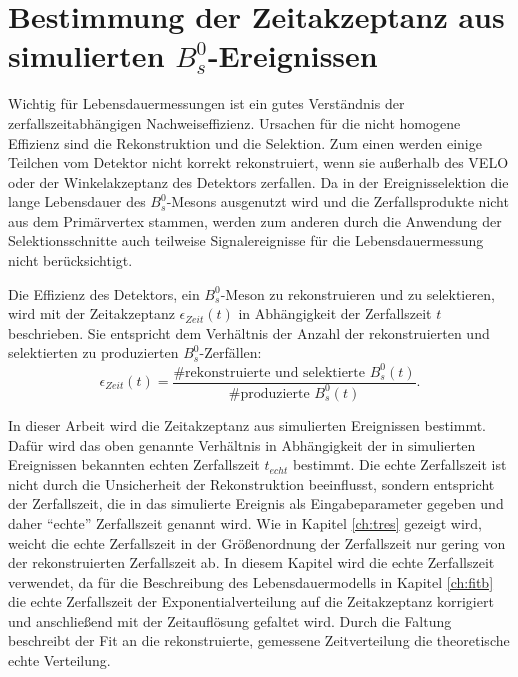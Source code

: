 \documentclass{article}
\begin{document}
\newpage
\section{Bestimmung der Zeitakzeptanz aus simulierten $B_s^0$-Ereignissen} 
\label{ch:acc}
Wichtig für Lebensdauermessungen ist ein gutes Verständnis der zerfallszeitabhängigen Nachweiseffizienz. Ursachen für die nicht homogene Effizienz sind die Rekonstruktion und die Selektion.
Zum einen werden einige Teilchen vom Detektor nicht korrekt rekonstruiert, wenn sie außerhalb des VELO oder der Winkelakzeptanz des Detektors zerfallen. Da in der Ereignisselektion die lange Lebensdauer des $B_s^0$-Mesons ausgenutzt wird und die Zerfallsprodukte nicht aus dem Primärvertex stammen, werden zum anderen durch die Anwendung der Selektionsschnitte auch teilweise Signalereignisse für die Lebensdauermessung nicht berücksichtigt.

Die Effizienz des Detektors, ein $B_s^0$-Meson zu rekonstruieren und zu selektieren, wird mit der Zeitakzeptanz $\epsilon_{Zeit}(t)$ in Abhängigkeit der Zerfallszeit $t$ beschrieben. Sie entspricht dem Verhältnis der Anzahl der rekonstruierten und selektierten zu produzierten $B_s^0$-Zerfällen:
 \[ \epsilon_{Zeit}(t) = \frac{\text{\# rekonstruierte und selektierte } B_s^0 (t)}{\text{\# produzierte } B_s^0 (t)}.\]

In dieser Arbeit wird die Zeitakzeptanz aus simulierten Ereignissen bestimmt. Dafür wird das oben genannte Verhältnis in Abhängigkeit der in simulierten Ereignissen bekannten echten Zerfallszeit $t_{echt}$ bestimmt. Die echte Zerfallszeit ist nicht durch die Unsicherheit der Rekonstruktion beeinflusst, sondern entspricht der Zerfallszeit, die in das simulierte Ereignis als Eingabeparameter gegeben und daher "`echte"' Zerfallszeit genannt wird. Wie in Kapitel \ref{ch:tres} gezeigt wird, weicht die echte Zerfallszeit in der Größenordnung der Zerfallszeit nur gering von der rekonstruierten Zerfallszeit ab. In diesem Kapitel wird die echte Zerfallszeit verwendet, da für die Beschreibung des Lebensdauermodells in Kapitel \ref{ch:fitb} die echte Zerfallszeit der Exponentialverteilung auf die Zeitakzeptanz korrigiert und anschließend mit der Zeitauflösung gefaltet wird. Durch die Faltung beschreibt der Fit an die rekonstruierte, gemessene Zeitverteilung die theoretische echte Verteilung.
\end{document}
